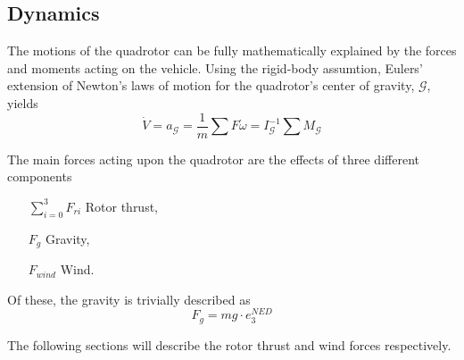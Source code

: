     \subsection{Dynamics}
        The motions of the quadrotor can be fully mathematically explained by the
        forces and moments acting on the vehicle. Using the rigid-body assumtion,
        Eulers' extension of Newton's laws of motion for the
        quadrotor's center of gravity, $\mathcal{G}$, yields
        \begin{subequations}
            \begin{equation}
                \dot{V} = a_{\mathcal{G}} = \frac{1}{m}\sum F
            \end{equation}
            \begin{equation}
                \dot{\omega} = I_{\mathcal{G}}^{-1}\sum M_{\mathcal{G}}
            \end{equation}
        \end{subequations}

        The main forces acting upon the quadrotor are the effects of three different components
        \begin{itemize}
            \item[$\sum_{i=0}^{3}F_{ri}$] Rotor thrust,
            \item[$F_{g}$] Gravity,
            \item[$F_{wind}$] Wind.
        \end{itemize}

        Of these, the gravity is trivially described as
        \begin{equation}
            F_{g} = mg\cdot e_{3}^{NED}
        \end{equation}

        The following sections will describe the rotor thrust and wind forces
        respectively.

        
        
